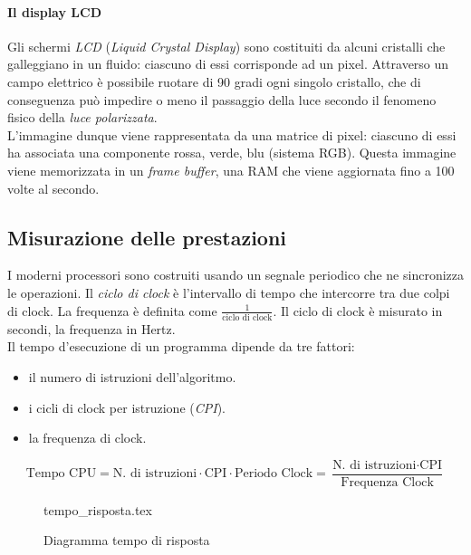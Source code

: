 \documentclass[class=book, crop=false]{standalone}
\begin{document}
\paragraph{Il display LCD}
Gli schermi \emph{LCD} (\emph{Liquid Crystal Display}) sono costituiti da alcuni cristalli che galleggiano in un fluido: ciascuno di essi corrisponde ad un pixel. Attraverso un campo elettrico è possibile ruotare di 90 gradi ogni singolo cristallo, che di conseguenza può impedire o meno il passaggio della luce secondo il fenomeno fisico della \emph{luce polarizzata}.\\
L'immagine dunque viene rappresentata da una matrice di pixel: ciascuno di essi ha associata una componente rossa, verde, blu (sistema RGB). Questa immagine viene memorizzata in un \emph{frame buffer}, una RAM che viene aggiornata  fino a 100 volte al secondo.

\subsection{Misurazione delle prestazioni}
I moderni processori sono costruiti usando un segnale periodico che ne sincronizza le operazioni. Il \emph{ciclo di clock} è l’intervallo di tempo che intercorre tra due colpi di clock. La frequenza è definita come $\frac{1}{\text{ciclo di clock}}$. Il ciclo di clock è misurato in secondi, la frequenza in Hertz.\\

Il tempo d'esecuzione di un programma dipende da tre fattori:
\begin{itemize}[nolistsep]
	\item il numero di istruzioni dell'algoritmo.
	\item i cicli di clock per istruzione (\emph{CPI}).
	\item la frequenza di clock.
\end{itemize}
\begin{equation*}
\text{Tempo CPU} = \text{N. di istruzioni} \cdot \text{CPI} \cdot \text{Periodo Clock} = \frac{\text{N. di istruzioni} \cdot \text{CPI}}{\text{Frequenza Clock}}
\end{equation*}

\begin{figure}[H]
	\centering
	{tempo_risposta.tex}
	\caption{Diagramma tempo di risposta}
\end{figure}
\end{document}
